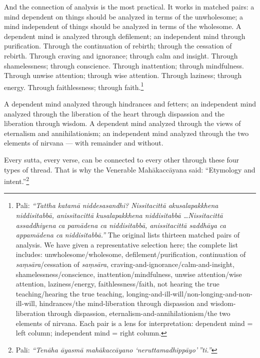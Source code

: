 And the connection of analysis is the most practical. It works in matched pairs: a mind dependent on things should be analyzed in terms of the unwholesome; a mind independent of things should be analyzed in terms of the wholesome. A dependent mind is analyzed through defilement; an independent mind through purification. Through the continuation of rebirth; through the cessation of rebirth. Through craving and ignorance; through calm and insight. Through shamelessness; through conscience. Through inattention; through mindfulness. Through unwise attention; through wise attention. Through laziness; through energy. Through faithlessness; through faith.\footnote{Pali: \textit{``Tattha katamā niddesasandhi? Nissitacittā akusalapakkhena niddisitabbā, anissitacittā kusalapakkhena niddisitabbā \ldots Nissitacittā assaddhiyena ca pamādena ca niddisitabbā, anissitacittā saddhāya ca appamādena ca niddisitabbā.''} The original lists thirteen matched pairs of analysis. We have given a representative selection here; the complete list includes: unwholesome/wholesome, defilement/purification, continuation of \textit{saṃsāra}/cessation of \textit{saṃsāra}, craving-and-ignorance/calm-and-insight, shamelessness/conscience, inattention/mindfulness, unwise attention/wise attention, laziness/energy, faithlessness/faith, not hearing the true teaching/hearing the true teaching, longing-and-ill-will/non-longing-and-non-ill-will, hindrances/the mind-liberation through dispassion and wisdom-liberation through dispassion, eternalism-and-annihilationism/the two elements of nirvana. Each pair is a lens for interpretation: dependent mind = left column; independent mind = right column.}

A dependent mind analyzed through hindrances and fetters; an independent mind analyzed through the liberation of the heart through dispassion and the liberation through wisdom. A dependent mind analyzed through the views of eternalism and annihilationism; an independent mind analyzed through the two elements of nirvana --- with remainder and without.

Every sutta, every verse, can be connected to every other through these four types of thread. That is why the Venerable Mahākaccāyana said: ``Etymology and intent.''\footnote{Pali: \textit{``Tenāha āyasmā mahākaccāyano `neruttamadhippāyo'\,''ti.''}}
